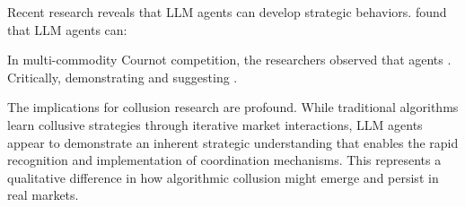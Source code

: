 Recent research reveals that LLM agents can develop strategic behaviors. \textcite[p.1]{lin_strategic_2025} found that LLM agents can:
    \begin{displayquote}
    \end{displayquote}
In multi-commodity Cournot competition, the researchers observed that agents  \parencite[p.2]{lin_strategic_2025}. Critically,  \parencite[p.6]{lin_strategic_2025} demonstrating  and suggesting  \parencite[p.6]{lin_strategic_2025}.

The implications for collusion research are profound. While traditional algorithms learn collusive strategies through iterative market interactions, LLM agents appear to demonstrate an inherent strategic understanding that enables the rapid recognition and implementation of coordination mechanisms. This represents a qualitative difference in how algorithmic collusion might emerge and persist in real markets.


% 
% 

